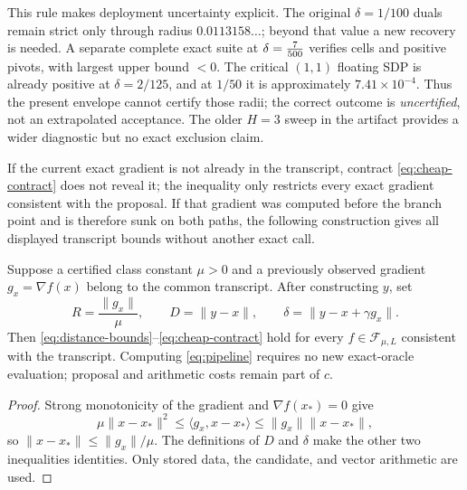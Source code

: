 \documentclass[smallextended]{svjour3}
\newcommand{\cF}{\mathcal{F}}
\newcommand{\ip}[2]{\langle #1,#2\rangle}
\newcommand{\norm}[1]{\lVert #1\rVert}
\begin{document}
This rule makes deployment uncertainty explicit.  The original $\delta=1/100$
duals remain strict only through radius $0.0113158\ldots$; beyond that value a
new recovery is needed.  A separate complete exact suite at
$\delta=\frac{7}{500}{}$ verifies \HsixMediumCertificates{} cells and
\HsixMediumPivots{} positive pivots, with largest upper bound
\HsixMediumUpper{}$<0$.  The critical $(1,1)$ floating SDP is already positive
at $\delta=2/125$, and at $1/50$ it is approximately $7.41\times10^{-4}$.
Thus the present envelope cannot certify those radii; the correct outcome is
\emph{uncertified}, not an extrapolated acceptance.  The older $H=3$ sweep in
the artifact provides a wider diagnostic but no exact exclusion claim.

If the current exact gradient is not already in the transcript, contract
\eqref{eq:cheap-contract} does not reveal it; the inequality only restricts
every exact gradient consistent with the proposal.  If that gradient was
computed before the branch point and is therefore sunk on both paths, the
following construction gives all displayed transcript bounds without another
exact call.

\begin{proposition}
\label{prop:transcript-pipeline}
Suppose a certified class constant $\mu>0$ and a previously observed gradient
$g_x=\nabla f(x)$ belong to the common transcript.  After constructing $y$, set
\begin{equation}
 R=\frac{\norm{g_x}}{\mu},\qquad
 D=\norm{y-x},\qquad
 \delta=\norm{y-x+\gamma g_x}.                    \label{eq:pipeline}
\end{equation}
Then \eqref{eq:distance-bounds}--\eqref{eq:cheap-contract} hold for every
$f\in\cF_{\mu,L}$ consistent with the transcript.  Computing
\eqref{eq:pipeline} requires no new exact-oracle evaluation; proposal and
arithmetic costs remain part of $c$.
\end{proposition}

\begin{proof}
Strong monotonicity of the gradient and $\nabla f(x_*)=0$ give
\[
 \mu\norm{x-x_*}^2
 \leq\ip{g_x}{x-x_*}
 \leq\norm{g_x}\norm{x-x_*},
\]
so $\norm{x-x_*}\leq\norm{g_x}/\mu$.  The definitions of $D$ and
$\delta$ make the other two inequalities identities.  Only stored data, the
candidate, and vector arithmetic are used.
\end{proof}
\end{document}
